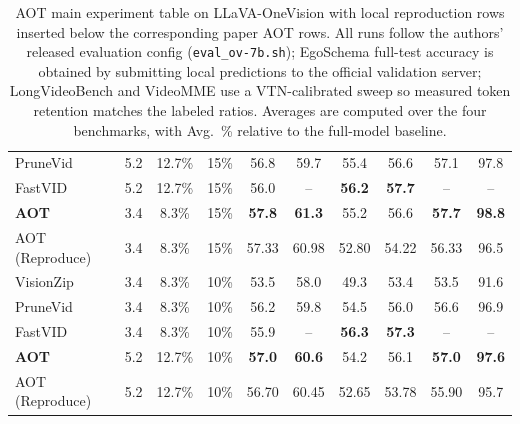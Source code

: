 \documentclass[11pt]{article}
\newcommand{\na}{--}
\newcommand{\repro}{Reproduce}
\begin{document}
\begin{table}[H]
{\begin{tabular}{lccc|cccc|cc}
PruneVid & 5.2 & 12.7\% & 15\% & 56.8 & 59.7 & 55.4 & 56.6 & 57.1 & 97.8 \\
FastVID & 5.2 & 12.7\% & 15\% & 56.0 & \na & \textbf{56.2} & \textbf{57.7} & \na & \na \\
\rowcolor{blue!8}
\textbf{AOT} & 3.4 & 8.3\% & 15\% & \textbf{57.8} & \textbf{61.3} & 55.2 & 56.6 & \textbf{57.7} & \textbf{98.8} \\
\rowcolor{green!8}
AOT (\repro) & 3.4 & 8.3\% & 15\% & 57.33 & 60.98 & 52.80 & 54.22 & 56.33 & 96.5 \\
VisionZip & 3.4 & 8.3\% & 10\% & 53.5 & 58.0 & 49.3 & 53.4 & 53.5 & 91.6 \\
PruneVid & 3.4 & 8.3\% & 10\% & 56.2 & 59.8 & 54.5 & 56.0 & 56.6 & 96.9 \\
FastVID & 3.4 & 8.3\% & 10\% & 55.9 & \na & \textbf{56.3} & \textbf{57.3} & \na & \na \\
\rowcolor{blue!8}
\textbf{AOT} & 5.2 & 12.7\% & 10\% & \textbf{57.0} & \textbf{60.6} & 54.2 & 56.1 & \textbf{57.0} & \textbf{97.6} \\
\rowcolor{green!8}
AOT (\repro) & 5.2 & 12.7\% & 10\% & 56.70 & 60.45 & 52.65 & 53.78 & 55.90 & 95.7 \\
\bottomrule
\end{tabular}}
\caption{AOT main experiment table on LLaVA-OneVision with local reproduction rows inserted below the corresponding paper AOT rows. All runs follow the authors' released evaluation config (\texttt{eval\_ov-7b.sh}); EgoSchema full-test accuracy is obtained by submitting local predictions to the official validation server; LongVideoBench and VideoMME use a VTN-calibrated sweep so measured token retention matches the labeled ratios. Averages are computed over the four benchmarks, with Avg.\ \% relative to the full-model baseline.}
\label{tab:aot-ov-main}
\end{table}
\end{document}
